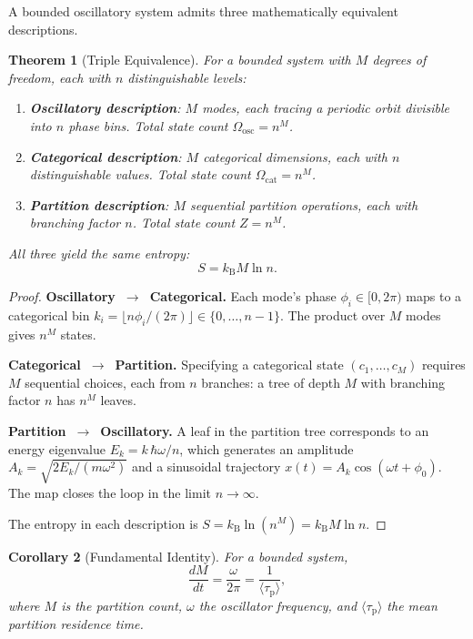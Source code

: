 \documentclass[twocolumn,10pt,a4paper]{article}
\newtheorem{theorem}{Theorem}[section]
\newtheorem{corollary}[theorem]{Corollary}
\theoremstyle{definition}
\theoremstyle{remark}
\newcommand{\kB}{k_{\mathrm{B}}}
\newcommand{\tauP}{\tau_{\mathrm{p}}}
\begin{document}
A bounded oscillatory system admits three mathematically equivalent descriptions.

\begin{theorem}[Triple Equivalence]
\label{thm:triple}
For a bounded system with $M$ degrees of freedom, each with $n$ distinguishable levels:
\begin{enumerate}[nosep]
\item \textbf{Oscillatory description}: $M$ modes, each tracing a periodic orbit divisible into $n$ phase bins. Total state count $\Omega_{\mathrm{osc}} = n^M$.
\item \textbf{Categorical description}: $M$ categorical dimensions, each with $n$ distinguishable values. Total state count $\Omega_{\mathrm{cat}} = n^M$.
\item \textbf{Partition description}: $M$ sequential partition operations, each with branching factor $n$. Total state count $Z = n^M$.
\end{enumerate}
All three yield the same entropy:
\begin{equation}
S = \kB M \ln n.
\label{eq:triple_entropy}
\end{equation}
\end{theorem}

\begin{proof}
\textbf{Oscillatory~$\to$~Categorical.} Each mode's phase $\phi_i \in [0, 2\pi)$ maps to a categorical bin $k_i = \lfloor n\phi_i/(2\pi)\rfloor \in \{0, \ldots, n-1\}$. The product over $M$ modes gives $n^M$ states.

\textbf{Categorical~$\to$~Partition.} Specifying a categorical state $(c_1, \ldots, c_M)$ requires $M$ sequential choices, each from $n$ branches: a tree of depth $M$ with branching factor $n$ has $n^M$ leaves.

\textbf{Partition~$\to$~Oscillatory.} A leaf in the partition tree corresponds to an energy eigenvalue $E_k = k\,\hbar\omega/n$, which generates an amplitude $A_k = \sqrt{2E_k/(m\omega^2)}$ and a sinusoidal trajectory $x(t) = A_k\cos(\omega t + \phi_0)$. The map closes the loop in the limit $n \to \infty$.

The entropy in each description is $S = \kB \ln(n^M) = \kB M \ln n$.
\end{proof}

\begin{corollary}[Fundamental Identity]
\label{cor:fundamental_identity}
For a bounded system,
\begin{equation}
\frac{dM}{dt} = \frac{\omega}{2\pi} = \frac{1}{\langle\tauP\rangle},
\label{eq:fundamental_identity}
\end{equation}
where $M$ is the partition count, $\omega$ the oscillator frequency, and $\langle\tauP\rangle$ the mean partition residence time.
\end{corollary}
\end{document}
